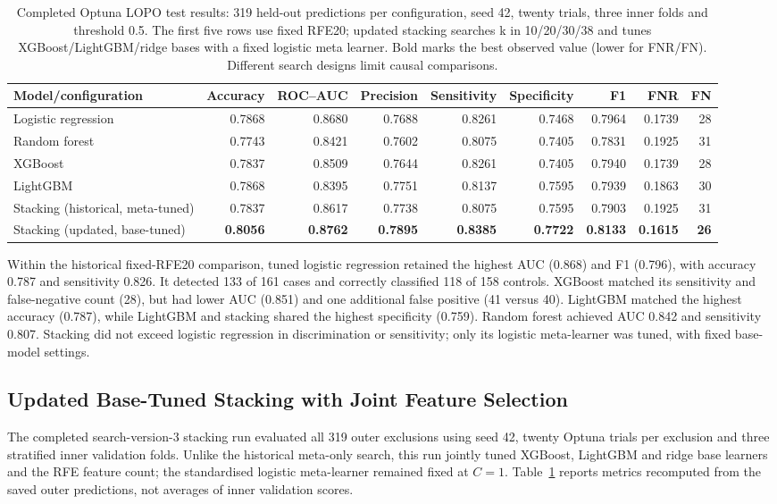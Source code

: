 \begin{table}[t]
\centering\footnotesize
\setlength{\tabcolsep}{4pt}
\caption{Completed Optuna LOPO test results: 319 held-out predictions per configuration, seed 42, twenty trials, three inner folds and threshold 0.5. The first five rows use fixed RFE20; updated stacking searches k in 10/20/30/38 and tunes XGBoost/LightGBM/ridge bases with a fixed logistic meta learner. Bold marks the best observed value (lower for FNR/FN). Different search designs limit causal comparisons.}
\label{tab:tuned-lopo-results}
\begin{tabular}{@{}lrrrrrrrr@{}}
\toprule
Model/configuration & Accuracy & ROC--AUC & Precision & Sensitivity & Specificity & F1 & FNR & FN \\
\midrule
Logistic regression & 0.7868 & 0.8680 & 0.7688 & 0.8261 & 0.7468 & 0.7964 & 0.1739 & 28 \\
Random forest & 0.7743 & 0.8421 & 0.7602 & 0.8075 & 0.7405 & 0.7831 & 0.1925 & 31 \\
XGBoost & 0.7837 & 0.8509 & 0.7644 & 0.8261 & 0.7405 & 0.7940 & 0.1739 & 28 \\
LightGBM & 0.7868 & 0.8395 & 0.7751 & 0.8137 & 0.7595 & 0.7939 & 0.1863 & 30 \\
Stacking (historical, meta-tuned) & 0.7837 & 0.8617 & 0.7738 & 0.8075 & 0.7595 & 0.7903 & 0.1925 & 31 \\
\midrule
Stacking (updated, base-tuned) & \textbf{0.8056} & \textbf{0.8762} & \textbf{0.7895} & \textbf{0.8385} & \textbf{0.7722} & \textbf{0.8133} & \textbf{0.1615} & \textbf{26} \\
\bottomrule
\end{tabular}
\end{table}

Within the historical fixed-RFE20 comparison, tuned logistic regression retained the highest AUC (0.868) and F1 (0.796), with accuracy 0.787 and sensitivity 0.826. It detected 133 of 161 cases and correctly classified 118 of 158 controls. XGBoost matched its sensitivity and false-negative count (28), but had lower AUC (0.851) and one additional false positive (41 versus 40). LightGBM matched the highest accuracy (0.787), while LightGBM and stacking shared the highest specificity (0.759). Random forest achieved AUC 0.842 and sensitivity 0.807. Stacking did not exceed logistic regression in discrimination or sensitivity; only its logistic meta-learner was tuned, with fixed base-model settings.

\subsection{Updated Base-Tuned Stacking with Joint Feature Selection}
The completed search-version-3 stacking run evaluated all 319 outer exclusions using seed 42, twenty Optuna trials per exclusion and three stratified inner validation folds. Unlike the historical meta-only search, this run jointly tuned XGBoost, LightGBM and ridge base learners and the RFE feature count; the standardised logistic meta-learner remained fixed at $C=1$. Table~\ref{tab:tuned-lopo-results} reports metrics recomputed from the saved outer predictions, not averages of inner validation scores.



